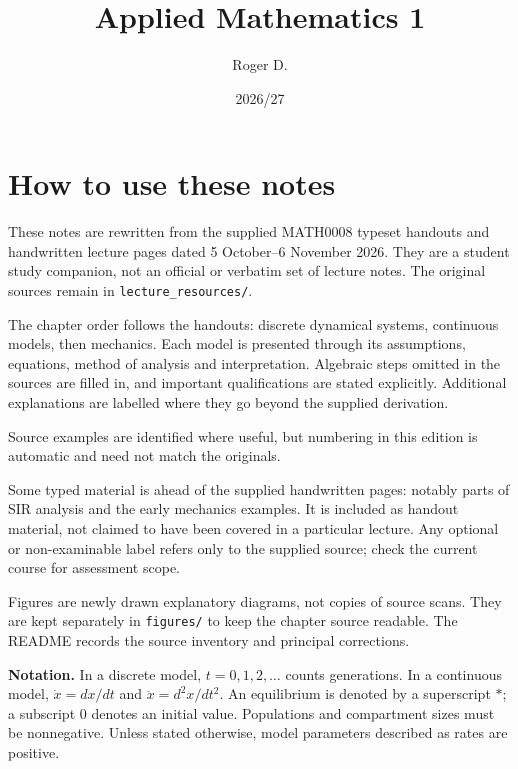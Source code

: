 \documentclass[11pt,a4paper,oneside]{report}
\title{Applied Mathematics 1\\[0.4em]\large}
\author{Roger D.}
\date{2026/27}
\theoremstyle{definition}
\theoremstyle{remark}
\numberwithin{equation}{chapter}
\begin{document}
\maketitle
{}
\chapter*{How to use these notes}
These notes are rewritten from the supplied MATH0008 typeset handouts and
handwritten lecture pages dated 5 October--6 November 2026. They are a
student study companion, not an official or verbatim set of lecture notes.
The original sources remain in \texttt{lecture\_resources/}.

The chapter order follows the handouts: discrete dynamical systems,
continuous models, then mechanics. Each model is presented through its
assumptions, equations, method of analysis and interpretation. Algebraic
steps omitted in the sources are filled in, and important qualifications
are stated explicitly. Additional explanations are labelled where they
go beyond the supplied derivation.

Source examples are identified where useful, but numbering in this edition
is automatic and need not match the originals.

Some typed material is ahead of the supplied handwritten pages: notably
parts of SIR analysis and the early mechanics examples. It is included as
handout material, not claimed to have been covered in a particular lecture.
Any optional or non-examinable label refers only to the supplied source;
check the current course for assessment scope.

Figures are newly drawn explanatory diagrams, not copies of source scans.
They are kept separately in \texttt{figures/} to keep the chapter source
readable. The README records the source inventory and principal corrections.

\textbf{Notation.} In a discrete model, $t=0,1,2,\ldots$ counts generations.
In a continuous model, $\dot x=dx/dt$ and $\ddot x=d^2x/dt^2$.
An equilibrium is denoted by a superscript $*$; a subscript $0$ denotes an
initial value. Populations and compartment sizes must be nonnegative.
Unless stated otherwise, model parameters described as rates are positive.
\tableofcontents
\clearpage
{}



\end{document}
